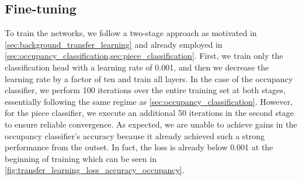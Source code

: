 \documentclass[../report.tex]{subfiles}
\begin{document}
\subsection{Fine-tuning}
\label{sec:transfer_learning_finetuning}
To train the networks, we follow a two-stage approach as motivated in \cref{sec:background_transfer_learning} and already employed in \cref{sec:occupancy_classification,sec:piece_classification}.
First, we train only the classification head with a learning rate of 0.001, and then we decrease the learning rate by a factor of ten and train all layers.
In the case of the occupancy classifier, we perform 100 iterations over the entire training set at both stages, essentially following the same regime as \cref{sec:occupancy_classification}.
However, for the piece classifier, we execute an additional 50 iterations in the second stage to ensure reliable convergence.
As expected, we are unable to achieve gains in the occupancy classifier's accuracy because it already achieved such a strong performance from the outset.
In fact, the loss is already below 0.001 at the beginning of training which can be seen in \cref{fig:transfer_learning_loss_accuracy_occupancy}.
\end{document}
